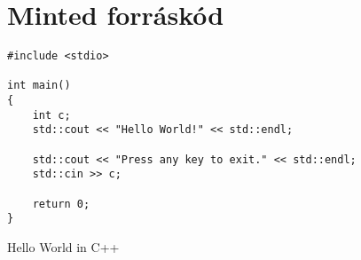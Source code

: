 \documentclass{elteikthesis}[2021/09/20]
\begin{document}

\chapter{Minted forráskód}
\label{ch:chapter}

\begin{listing}[H]
\begin{verbatim}
#include <stdio>

int main() 
{
	int c;
	std::cout << "Hello World!" << std::endl;

	std::cout << "Press any key to exit." << std::endl;
	std::cin >> c;
	
	return 0;
}
\end{verbatim}
\caption{Hello World in C++}
\end{listing}

{}
\listoflistings
\end{document}

